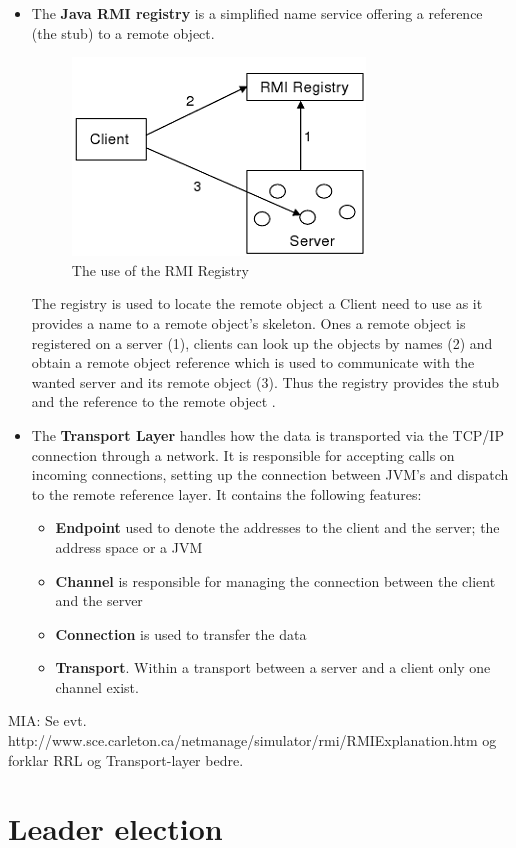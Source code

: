 \documentclass[Main]{subfiles}
\begin{document}
\begin{itemize}
\item The \textbf{Java RMI registry} is a simplified name service offering a reference (the stub) to a remote object.
\begin{figure}[H]
\centering
\includegraphics[scale=0.8]{Figurer/RMI-registry.png}
\caption{The use of the RMI Registry \cite{RMI-slides}}
\end{figure}
The registry is used to locate the remote object a Client need to use as it provides a name to a remote object's skeleton. Ones a remote object is registered on a server (1), clients can look up the objects by names (2) and obtain a remote object reference which is used to communicate with the wanted server and its remote object (3). Thus the registry provides the stub and the reference to the remote object \cite{Getting-started}.

\item The \textbf{Transport Layer} handles how the data is transported via the TCP/IP connection through a network. It is responsible for accepting calls on incoming connections, setting up the connection between JVM's and dispatch to the remote reference layer. It contains the following features:
\begin{itemize}
\item \textbf{Endpoint} used to denote the addresses to the client and the server; the address space or a JVM
\item \textbf{Channel} is responsible for managing the connection between the client and the server
\item \textbf{Connection} is used to transfer the data
\item \textbf{Transport}. Within a transport between a server and a client only one channel exist.
\end{itemize}

\setlength\parindent{300pt}\cite{RMI-slides}

\end{itemize}

MIA: Se evt. http://www.sce.carleton.ca/netmanage/simulator/rmi/RMIExplanation.htm og forklar RRL og Transport-layer bedre.

\section{Leader election}
\end{document}
